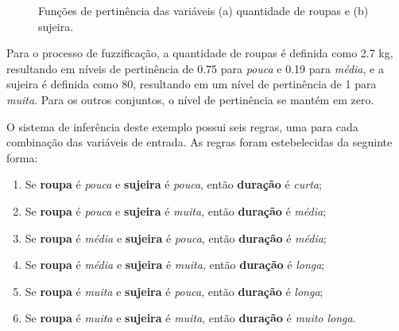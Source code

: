 \documentclass[12pt]{article}
\begin{document}
\begin{figure}
\centering
{}
\hspace{0.8cm}
\caption{Funções de pertinência das variáveis (a) quantidade de roupas e (b) sujeira.}
\label{fig:varmembership}
\end{figure}

Para o processo de fuzzificação, a quantidade de roupas é definida como 2.7 kg, resultando em níveis de pertinência de 0.75 para \textit{pouca} e 0.19 para \textit{média}, e a sujeira é definida como 80, resultando em um nível de pertinência de 1 para \textit{muita}. Para os outros conjuntos, o nível de pertinência se mantém em zero.

O sistema de inferência deste exemplo possui seis regras, uma para cada combinação das variáveis de entrada. As regras foram estebelecidas da seguinte forma:

\begin{enumerate}
    \item Se \textbf{roupa} é \textit{pouca} e \textbf{sujeira} é \textit{pouca}, então \textbf{duração} é \textit{curta};
    \item Se \textbf{roupa} é \textit{pouca} e \textbf{sujeira} é \textit{muita}, então \textbf{duração} é \textit{média};
    \item Se \textbf{roupa} é \textit{média} e \textbf{sujeira} é \textit{pouca}, então \textbf{duração} é \textit{média};
    \item Se \textbf{roupa} é \textit{média} e \textbf{sujeira} é \textit{muita}, então \textbf{duração} é \textit{longa};
    \item Se \textbf{roupa} é \textit{muita} e \textbf{sujeira} é \textit{pouca}, então \textbf{duração} é \textit{longa};
    \item Se \textbf{roupa} é \textit{muita} e \textbf{sujeira} é \textit{muita}, então \textbf{duração} é \textit{muito longa}.
\end{enumerate}
\end{document}
